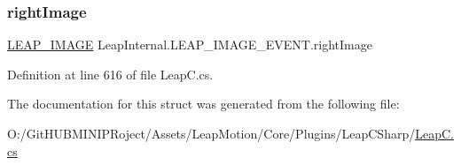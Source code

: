 \subsubsection{\texorpdfstring{rightImage}{rightImage}}
{\footnotesize\ttfamily \mbox{\hyperlink{struct_leap_internal_1_1_l_e_a_p___i_m_a_g_e}{L\+E\+A\+P\+\_\+\+I\+M\+A\+GE}} Leap\+Internal.\+L\+E\+A\+P\+\_\+\+I\+M\+A\+G\+E\+\_\+\+E\+V\+E\+N\+T.\+right\+Image}



Definition at line 616 of file Leap\+C.\+cs.



The documentation for this struct was generated from the following file\+:\begin{DoxyCompactItemize}
\item 
O\+:/\+Git\+H\+U\+B\+M\+I\+N\+I\+P\+Roject/\+Assets/\+Leap\+Motion/\+Core/\+Plugins/\+Leap\+C\+Sharp/\mbox{\hyperlink{_leap_c_8cs}{Leap\+C.\+cs}}\end{DoxyCompactItemize}

